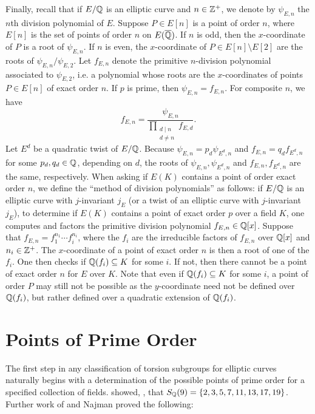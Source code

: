 Finally, recall that if $E/\mathbb{Q}$ is an elliptic curve and $n \in \mathbb{Z}^+$, we denote by $\psi_{E,n}$ the $n$th division polynomial of $E$. Suppose $P \in E[n]$ is a point of order $n$, where $E[n]$ is the set of points of order $n$ on $E(\overline{\mathbb{Q}})$. If $n$ is odd, then the $x$-coordinate of $P$ is a root of $\psi_{E,n}$. If $n$ is even, the $x$-coordinate of $P \in E[n] \setminus E[2]$ are the roots of $\psi_{E,n}/\psi_{E,2}$. Let $f_{E,n}$ denote the primitive $n$-division polynomial associated to $\psi_{E,2}$, i.e. a polynomial whose roots are the $x$-coordinates of points $P \in E[n]$ of exact order $n$. If $p$ is prime, then $\psi_{E,n}= f_{E,n}$. For composite $n$, we have
	\[
	f_{E,n}= \dfrac{\psi_{E,n}}{\prod_{\substack{d \mid n \\ d \neq n}} f_{E,d}}.
	\]
Let $E^d$ be a quadratic twist of $E/\mathbb{Q}$. Because $\psi_{E,n}= p_d \psi_{E^d,n}$ and $f_{E,n}= q_d f_{E^d,n}$ for some $p_d, q_d \in \mathbb{Q}$, depending on $d$, the roots of $\psi_{E,n}, \psi_{E^d,n}$ and $f_{E,n}, f_{E^d,n}$ are the same, respectively. When asking if $E(K)$ contains a point of order exact order $n$, we define the ``method of division polynomials'' as follows: if $E/\mathbb{Q}$ is an elliptic curve with $j$-invariant $j_E$ (or a twist of an elliptic curve with $j$-invariant $j_E$), to determine if $E(K)$ contains a point of exact order $p$ over a field $K$, one computes and factors the primitive division polynomial $f_{E,n} \in \mathbb{Q}[x]$. Suppose that $f_{E,n}= f_1^{n_1} \cdots f_i^{n_i}$, where the $f_i$ are the irreducible factors of $f_{E,n}$ over $\mathbb{Q}[x]$ and $n_i \in \mathbb{Z}^+$. The $x$-coordinate of a point of exact order $n$ is then a root of one of the $f_i$. One then checks if $\mathbb{Q}(f_i) \subseteq K$ for some $i$. If not, then there cannot be a point of exact order $n$ for $E$ over $K$. Note that even if $\mathbb{Q}(f_i) \subseteq K$ for some $i$, a point of order $P$ may still not be possible as the $y$-coordinate need not be defined over $\mathbb{Q}(f_i)$, but rather defined over a quadratic extension of $\mathbb{Q}(f_i)$. 





\section{Points of Prime Order\label{sec:nonicporders}}

The first step in any classification of torsion subgroups for elliptic curves naturally begins with a determination of the possible points of prime order for a specified collection of fields. \lozrob{} showed, \cite[Corollary~1.5]{lozanorobledo13}, that $S_{\mathbb{Q}}(9)= \{ 2, 3, 5, 7, 11, 13, 17, 19 \}$. Further work of \gonjim{} and Najman proved the following:


